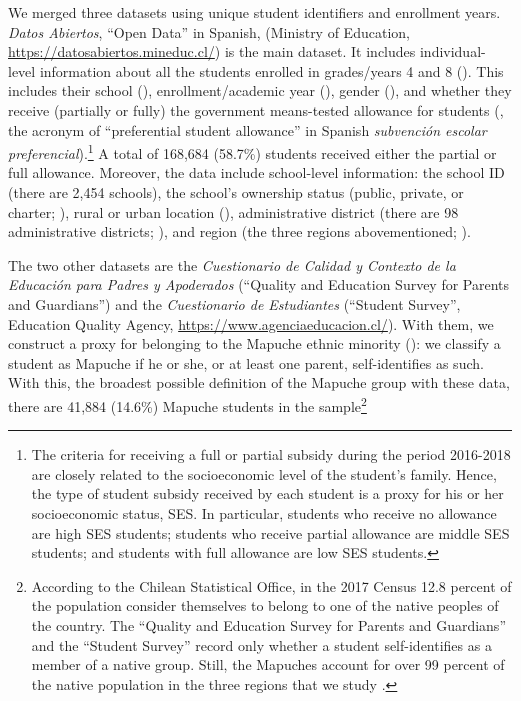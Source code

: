 We merged three datasets using unique student identifiers and enrollment years. \textit{Datos Abiertos}, ``Open Data'' in Spanish, (Ministry of Education, \url{https://datosabiertos.mineduc.cl/}) is the main dataset. It includes individual-level information about all the students enrolled in grades/years 4 and 8 (). This includes their school (), enrollment/academic year (), gender (), and whether they receive (partially or fully) the government means-tested allowance for students (, the acronym of ``preferential student allowance'' in Spanish \textit{subvención escolar preferencial}).\footnote{The criteria for receiving a full or partial subsidy during the period 2016-2018 are closely related to the socioeconomic level of the student's family. Hence, the type of student subsidy received by each student is a proxy for his or her socioeconomic status, SES. In particular, students who receive no allowance are high SES students; students who receive partial allowance are middle SES students; and students with full allowance are low SES students.} A total of 168,684 (58.7\%) students received either the partial or full allowance.
Moreover, the data include school-level information: the school ID (there are 2,454 schools), the school's ownership status (public, private, or charter;  ), rural or urban location (), administrative district (there are 98 administrative districts; ), and region (the three regions abovementioned; ).

The two other datasets are the \textit{Cuestionario de Calidad y Contexto de la Educación para Padres y Apoderados} (``Quality and Education Survey for Parents and Guardians'') and the \textit{Cuestionario de Estudiantes} (``Student Survey'', Education Quality Agency, \url{https://www.agenciaeducacion.cl/}).
With them, we construct a proxy for belonging to the Mapuche ethnic minority (): we classify a student as Mapuche if he or she, or at least one parent, self-identifies as such. With this, the broadest possible definition of the Mapuche group with these data, there are 41,884 (14.6\%) Mapuche students in the sample\footnote{According to the Chilean Statistical Office, in the 2017 Census 12.8 percent of the population consider themselves to belong to one of the native peoples of the country. The ``Quality and Education Survey for Parents and Guardians'' and the ``Student Survey'' record only whether a student self-identifies as a member of a native group. Still, the Mapuches account for over 99 percent of the native population in the three regions that we study \citep{instituto2018radiografia}.}



